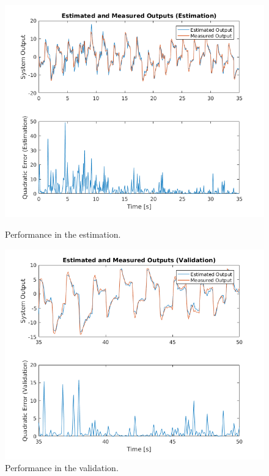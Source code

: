 \documentclass[11pt]{article}
\begin{document}
\begin{figure}[H]
	\centering
	\begin{minipage}{.5\textwidth}
		\centering
		\includegraphics[keepaspectratio=true, scale=0.4]{images/armax_performance_estimation.png}
		\caption{Performance in the estimation.}
		\label{armax_performance_estimation}
	\end{minipage}%
	\begin{minipage}{.5\textwidth}
		\centering
		\includegraphics[keepaspectratio=true, scale=0.4]{images/armax_performance_validation.png}
		\caption{Performance in the validation.}
		\label{armax_performance_validation}
	\end{minipage}
\end{figure}
\end{document}
